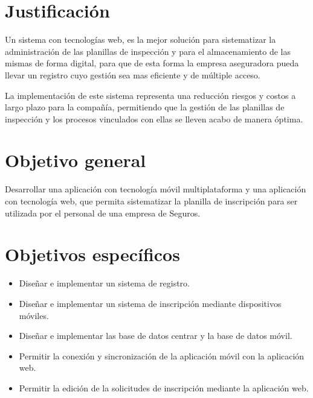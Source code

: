 \setlength{\parskip}{0mm}


\section{Justificación}


Un sistema con tecnologías web, es la mejor solución para sistematizar la administración de las planillas de inspección y para el almacenamiento de las mismas de forma digital, para que de esta forma la empresa aseguradora pueda llevar un registro cuyo gestión sea mas eficiente y de múltiple acceso.

La implementación de este sistema representa una reducción riesgos y costos a largo plazo para la compañía, permitiendo que la gestión de las planillas de inspección y los procesos vinculados con ellas se lleven acabo de manera óptima.

\section{Objetivo general}

Desarrollar una aplicación con tecnología móvil multiplataforma y una aplicación con tecnología web, que permita sistematizar la planilla de inscripción para ser utilizada por el personal de una empresa de Seguros. 

\section{Objetivos específicos}

\begin{itemize}

	\item Diseñar e implementar un sistema de registro.
	
	\item Diseñar e implementar un sistema de inscripción mediante dispositivos móviles.
	
	\item Diseñar e implementar las base de datos centrar y la base de datos móvil.
	
	\item Permitir la conexión y sincronización de la aplicación móvil con la aplicación web.
	
	\item Permitir la edición de la solicitudes de inscripción mediante la aplicación web.
	
	

\end{itemize}



